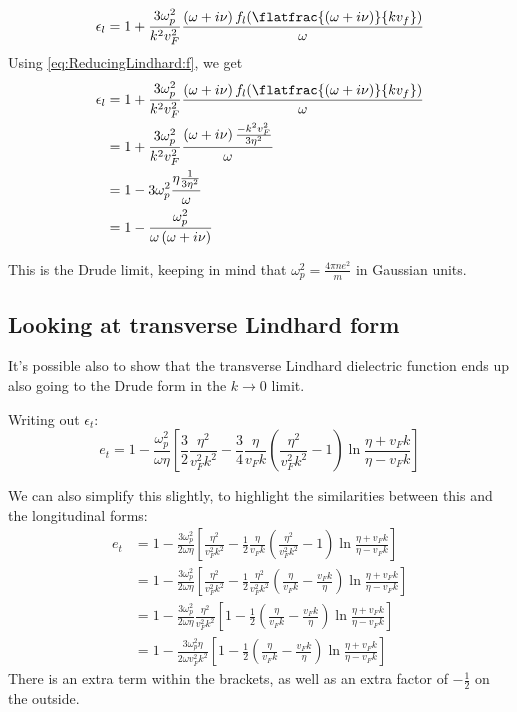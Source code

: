 \documentclass[../../main.tex]{subfiles}
\newcommand{\vf}{v_F}
\begin{document}
\begin{equation}
	 \epsilon_l = 1 + \frac{3 \omega_p^2}{k^2 v_F^2} \frac{\left(\omega + i \nu \right) f_l(\flatfrac{(\omega + i \nu)}{k v_f})}{\omega}
\end{equation}
Using \eqref{eq:ReducingLindhard:f}, we get
\begin{align}
	\epsilon_l &= 1 + \frac{3 \omega_p^2}{k^2 v_F^2} \frac{\left(\omega + i \nu \right) f_l(\flatfrac{(\omega + i \nu)}{k v_f})}{\omega} \\
	&= 1 + \frac{3 \omega_p^2}{k^2 v_F^2} \frac{\left(\omega + i \nu \right) \frac{-k^2 \vf^2}{3 \eta^2}}{\omega} \\
	&= 1 - 3 \omega_p^2 \frac{\eta \frac{1}{ 3\eta^2}}{\omega} \\
	&= 1 - \frac{ \omega_p^2}{\omega \left( \omega + i \nu \right)}
\end{align}

This is the Drude limit, keeping in mind that $\omega_p^2 = \frac{4\pi n e^2}{m}$ in Gaussian units.

\subsection{Looking at transverse Lindhard form}
It's possible also to show that the transverse Lindhard dielectric function ends up also going to the Drude form in the $k \rightarrow 0$ limit. 

Writing out $\epsilon_t$:
\begin{equation} 
	e_t = 1 - \frac{\omega_p^2}{\omega \eta} \left[\frac32 \frac{\eta^2}{\vf^2 k^2} - \frac34 \frac{\eta}{\vf k} \left(\frac{\eta^2}{\vf^2 k^2} - 1 \right)\ln\frac{\eta + \vf k}{\eta - \vf k} \right]
\end{equation}

We can also simplify this slightly, to highlight the similarities between this and the longitudinal forms:
\begin{align}
	e_t &= 1 - \frac{3 \omega_p^2}{2\omega \eta} \left[ \frac{\eta^2}{\vf^2 k^2} - \frac12 \frac{\eta}{\vf k} \left(\frac{\eta^2}{\vf^2 k^2} - 1 \right)\ln\frac{\eta + \vf k}{\eta - \vf k} \right] \\
	&= 1 - \frac{3 \omega_p^2}{2\omega \eta} \left[ \frac{\eta^2}{\vf^2 k^2} - \frac12 \frac{\eta^2}{\vf^2 k^2} \left(\frac{\eta}{\vf k} - \frac{\vf k}{\eta} \right)\ln\frac{\eta + \vf k}{\eta - \vf k} \right] \\
	&= 1 - \frac{3 \omega_p^2}{2\omega \eta} \frac{\eta^2}{\vf^2 k^2} \left[ 1 - \frac12 \left(\frac{\eta}{\vf k} - \frac{\vf k}{\eta} \right)\ln\frac{\eta + \vf k}{\eta - \vf k} \right] \\
	&= 1 - \frac{3 \omega_p^2 \eta}{2\omega \vf^2 k^2} \left[ 1 - \frac12 \left(\frac{\eta}{\vf k} - \frac{\vf k}{\eta} \right)\ln\frac{\eta + \vf k}{\eta - \vf k} \right]\label{eq:ReducingLindhard:et}
\end{align}
There is an extra term within the brackets, as well as an extra factor of $-\frac12$ on the outside.
\end{document}
